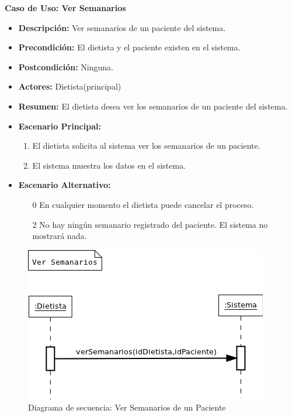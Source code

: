 \textbf{Caso de Uso: Ver Semanarios}
\begin{itemize}
\item \textbf{Descripción:} Ver semanarios de un paciente del sistema.
\item \textbf{Precondición:} El dietista y el paciente existen en el sistema.
\item \textbf{Postcondición:} Ninguna.
\item \textbf{Actores:} Dietista(principal)
\item \textbf{Resumen:} El dietista desea ver los semanarios de un paciente del sistema.
\item \textbf{Escenario Principal:}
\begin{enumerate}
\item El dietista solicita al sistema ver los semanarios de un paciente.
\item El sistema muestra los datos en el sistema.
\end{enumerate}
\item \textbf{Escenario Alternativo:}
\begin{enumerate}
\item[0] En cualquier momento el dietista puede cancelar el proceso.
\item[2] No hay ningún semanario registrado del paciente. El sistema no mostrará nada.
\end{enumerate}
\end{itemize}
\begin{figure}[H]
  \label{ds_versemanarios}
  \begin{center}
    \includegraphics[scale=0.7]{../img/DS_VerSemanarios.png}
  \end{center}
  \caption{Diagrama de secuencia: Ver Semanarios de un Paciente}
\end{figure}
